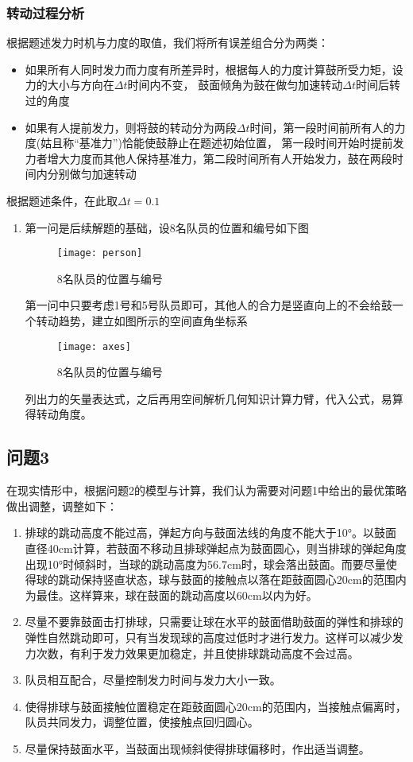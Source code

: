 \documentclass[withoutpreface,bwprint]{cumcmthesis} %
\begin{document}
\subsubsection{转动过程分析}
根据题述发力时机与力度的取值，我们将所有误差组合分为两类：
\begin{itemize}
	\item 如果所有人同时发力而力度有所差异时，根据每人的力度计算鼓所受力矩，设力的大小与方向在$\Delta t$时间内不变，
	鼓面倾角为鼓在做匀加速转动$\Delta t$时间后转过的角度
	\item 如果有人提前发力，则将鼓的转动分为两段$\Delta t$时间，第一段时间前所有人的力度(姑且称“基准力”)恰能使鼓静止在题述初始位置，
	第一段时间开始时提前发力者增大力度而其他人保持基准力，第二段时间所有人开始发力，鼓在两段时间内分别做匀加速转动	
\end{itemize}
根据题述条件，在此取$\Delta t=0.1$

\begin{enumerate}
\item 第一问是后续解题的基础，设8名队员的位置和编号如下图
\begin{figure}[!h]
    \centering
    \texttt{[image: person]}
    \caption{8名队员的位置与编号}
    \label{fig:members}
\end{figure}
第一问中只要考虑1号和5号队员即可，其他人的合力是竖直向上的不会给鼓一个转动趋势，建立如图所示的空间直角坐标系
\begin{figure}[!h]
    \centering
    \texttt{[image: axes]}
    \caption{8名队员的位置与编号}
    \label{fig:p3}
\end{figure}
列出力的矢量表达式，之后再用空间解析几何知识计算力臂，代入公式，易算得转动角度。
\end{enumerate}

\subsection{问题3}

在现实情形中，根据问题2的模型与计算，我们认为需要对问题1中给出的最优策略做出调整，调整如下：
\begin{enumerate}
\item 排球的跳动高度不能过高，弹起方向与鼓面法线的角度不能大于10°。以鼓面直径40cm计算，若鼓面不移动且排球弹起点为鼓面圆心，则当排球的弹起角度出现10°时倾斜时，当球的跳动高度为56.7cm时，球会落出鼓面。而要尽量使得球的跳动保持竖直状态，球与鼓面的接触点以落在距鼓面圆心20cm的范围内为最佳。这样算来，球在鼓面的跳动高度以60cm以内为好。
\item 尽量不要靠鼓面击打排球，只需要让球在水平的鼓面借助鼓面的弹性和排球的弹性自然跳动即可，只有当发现球的高度过低时才进行发力。这样可以减少发力次数，有利于发力效果更加稳定，并且使排球跳动高度不会过高。
\item 队员相互配合，尽量控制发力时间与发力大小一致。
\item 使得排球与鼓面接触位置稳定在距鼓面圆心20cm的范围内，当接触点偏离时，队员共同发力，调整位置，使接触点回归圆心。
\item 尽量保持鼓面水平，当鼓面出现倾斜使得排球偏移时，作出适当调整。
\end{enumerate}
\end{document}
